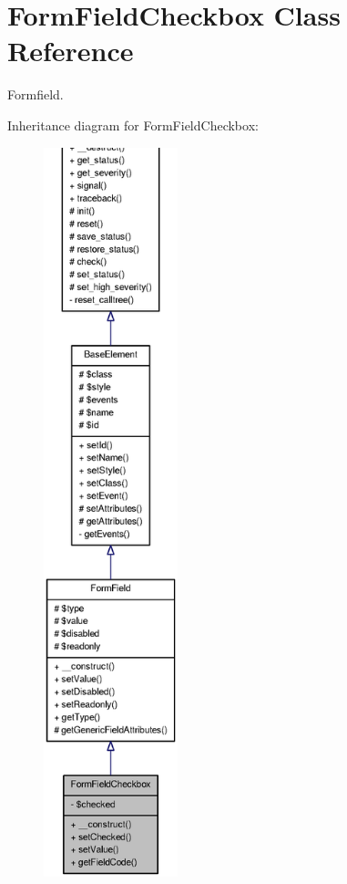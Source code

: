 \section{FormFieldCheckbox Class Reference}
\label{classFormFieldCheckbox}


Formfield.  




Inheritance diagram for FormFieldCheckbox:\nopagebreak
\begin{figure}[H]
\begin{center}
\leavevmode
\includegraphics[height=600pt]{classFormFieldCheckbox__inherit__graph}
\end{center}
\end{figure}


